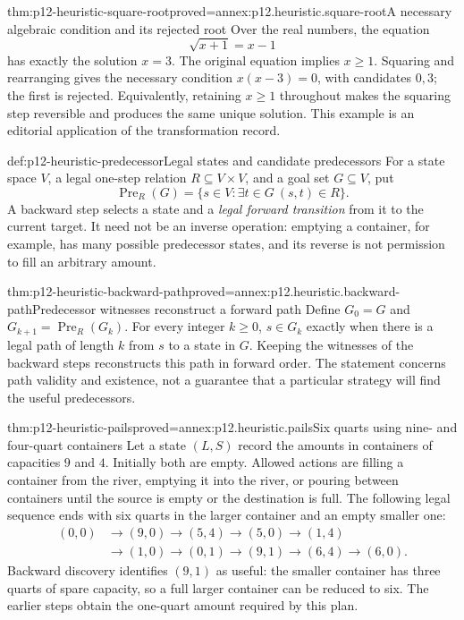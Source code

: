 \begin{hbtheorem}{thm:p12-heuristic-square-root}{proved=annex:p12.heuristic.square-root}{A necessary algebraic condition and its rejected root}
Over the real numbers, the equation
\[
                         \sqrt{x+1}=x-1
\]
has exactly the solution \(x=3\). The original equation implies
\(x\ge1\). Squaring and rearranging gives the necessary condition
\(x(x-3)=0\), with candidates \(0,3\); the first is rejected.
Equivalently, retaining \(x\ge1\) throughout makes the squaring
step reversible and produces the same unique solution.
This example is an editorial application of the transformation record.
\end{hbtheorem}

\begin{hbdefinition}{def:p12-heuristic-predecessor}{Legal states and candidate predecessors}
For a state space \(V\), a legal one-step relation
\(R\subseteq V\times V\), and a goal set \(G\subseteq V\), put
\[
 \operatorname{Pre}_R(G)=
     \{s\in V:\exists t\in G\ (s,t)\in R\}.
\]
A backward step selects a state and a \emph{legal forward transition}
from it to the current target. It need not be an inverse operation:
emptying a container, for example, has many possible predecessor
states, and its reverse is not permission to fill an arbitrary amount.
\end{hbdefinition}

\begin{hbtheorem}{thm:p12-heuristic-backward-path}{proved=annex:p12.heuristic.backward-path}{Predecessor witnesses reconstruct a forward path}
Define \(G_0=G\) and \(G_{k+1}=\operatorname{Pre}_R(G_k)\).
For every integer \(k\ge0\), \(s\in G_k\) exactly when there is a legal path of length
\(k\) from \(s\) to a state in \(G\). Keeping the witnesses
of the backward steps reconstructs this path in forward order.
The statement concerns path validity and existence, not a guarantee
that a particular strategy will find the useful predecessors.
\end{hbtheorem}

\begin{hbtheorem}{thm:p12-heuristic-pails}{proved=annex:p12.heuristic.pails}{Six quarts using nine- and four-quart containers}
Let a state \((L,S)\) record the amounts in containers of capacities
\(9\) and \(4\). Initially both are empty. Allowed actions are
filling a container from the river, emptying it into the river, or
pouring between containers until the source is empty or the destination
is full. The following legal sequence ends with six quarts in the
larger container and an empty smaller one:
\[
\begin{aligned}
(0,0)&\to(9,0)\to(5,4)\to(5,0)\to(1,4)\\
     &\to(1,0)\to(0,1)\to(9,1)\to(6,4)\to(6,0).
\end{aligned}
\]
Backward discovery identifies \((9,1)\) as useful: the smaller
container has three quarts of spare capacity, so a full larger
container can be reduced to six. The earlier steps obtain the
one-quart amount required by this plan.
\end{hbtheorem}

